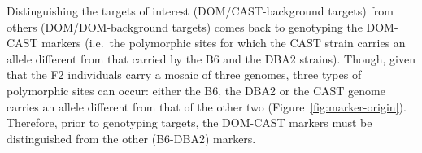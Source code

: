 
Distinguishing the targets of interest (DOM/CAST-background targets) from others (DOM/DOM-background targets) comes back to genotyping the DOM-CAST markers (i.e.\ the polymorphic sites for which the CAST strain carries an allele different from that carried by the B6 and the DBA2 strains).
Though, given that the F2 individuals carry a mosaic of three genomes, three types of polymorphic sites can occur: either the B6, the DBA2 or the CAST genome carries an allele different from that of the other two (Figure~\ref{fig:marker-origin}).
Therefore, prior to genotyping targets, the DOM-CAST markers must be distinguished from the other (B6-DBA2) markers.


